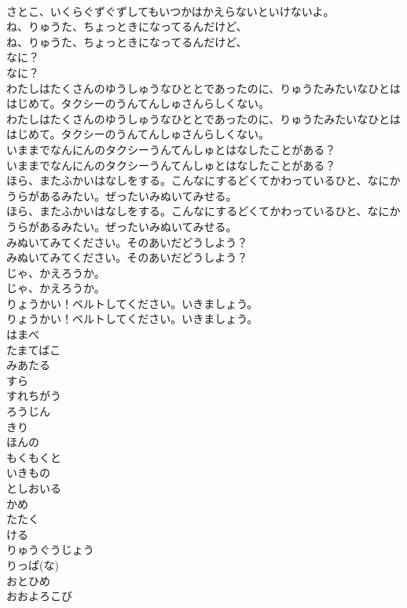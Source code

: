 \documentclass[8pt]{extreport}
\begin{document}
\begin{CJK}{UTF8}{min}
\\	さとこ、いくらぐずぐずしてもいつかはかえらないといけないよ。
\\	ね、りゅうた、ちょっときになってるんだけど、
\\	ね、りゅうた、ちょっときになってるんだけど、
\\	なに？
\\	なに？
\\	わたしはたくさんのゆうしゅうなひととであったのに、りゅうたみたいなひとははじめて。タクシーのうんてんしゅさんらしくない。
\\	わたしはたくさんのゆうしゅうなひととであったのに、りゅうたみたいなひとははじめて。タクシーのうんてんしゅさんらしくない。
\\	いままでなんにんのタクシーうんてんしゅとはなしたことがある？
\\	いままでなんにんのタクシーうんてんしゅとはなしたことがある？
\\	ほら、またふかいはなしをする。こんなにするどくてかわっているひと、なにかうらがあるみたい。ぜったいみぬいてみせる。
\\	ほら、またふかいはなしをする。こんなにするどくてかわっているひと、なにかうらがあるみたい。ぜったいみぬいてみせる。
\\	みぬいてみてください。そのあいだどうしよう？
\\	みぬいてみてください。そのあいだどうしよう？
\\	じゃ、かえろうか。
\\	じゃ、かえろうか。
\\	りょうかい！ベルトしてください。いきましょう。
\\	りょうかい！ベルトしてください。いきましょう。
\\	はまべ
\\	たまてばこ
\\	みあたる
\\	すら
\\	すれちがう
\\	ろうじん
\\	きり
\\	ほんの
\\	もくもくと
\\	いきもの
\\	としおいる
\\	かめ
\\	たたく
\\	ける
\\	りゅうぐうじょう
\\	りっぱ(な)
\\	おとひめ
\\	おおよろこび

\end{CJK}
\end{document}
